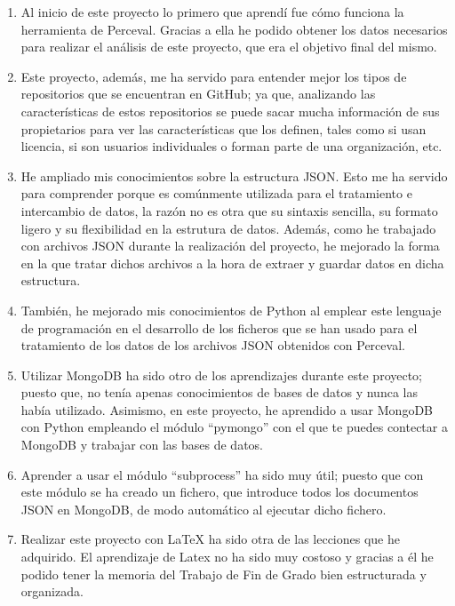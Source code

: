 \documentclass[a4paper, 12pt]{book}
\begin{document}
\begin{enumerate}
  \item  Al inicio de este proyecto lo primero que aprendí fue cómo funciona la herramienta de Perceval. Gracias a ella he podido obtener los datos necesarios para realizar el análisis de este proyecto, que era el objetivo final del mismo. 
  \item  Este proyecto, además, me ha servido para entender mejor los tipos de repositorios que se encuentran en GitHub; ya que, analizando las características de estos repositorios se puede sacar mucha información de sus propietarios para ver las características que los definen, tales como si usan licencia, si son usuarios individuales o forman parte de una organización, etc.
  \item  He ampliado mis conocimientos sobre la estructura JSON. Esto me ha servido para comprender porque es comúnmente utilizada para el tratamiento e intercambio de datos, la razón no es otra que su sintaxis sencilla, su formato ligero y su flexibilidad en la estrutura de datos. Además, como he trabajado con archivos JSON durante la realización del proyecto, he mejorado la forma en la que tratar dichos archivos a la hora de extraer y guardar datos en dicha estructura.  
  \item  También, he mejorado mis conocimientos de Python al emplear este lenguaje de programación en el desarrollo de los ficheros que se han usado para el tratamiento de los datos de los archivos JSON obtenidos con Perceval.    
  \item  Utilizar MongoDB ha sido otro de los aprendizajes durante este proyecto; puesto que, no tenía apenas conocimientos de bases de datos y nunca las había utilizado. Asimismo, en este proyecto, he aprendido a usar MongoDB con Python empleando el módulo ``pymongo'' con el que te puedes contectar a MongoDB y trabajar con las bases de datos.
  \item  Aprender a usar el módulo ``subprocess'' ha sido muy útil; puesto que con este módulo se ha creado un fichero, que introduce todos los documentos JSON en MongoDB, de modo automático al ejecutar dicho fichero.
  \item  Realizar este proyecto con LaTeX ha sido otra de las lecciones que he adquirido. El aprendizaje de Latex no ha sido muy costoso y gracias a él he podido tener la memoria del Trabajo de Fin de Grado bien estructurada y organizada.
\end{enumerate}
\end{document}
